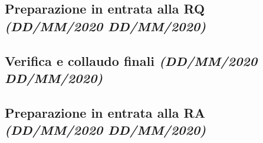\documentclass[../piano-di-progetto.tex]{subfiles}
\begin{document}
\subsection[Preparazione in entrata alla RQ]{Preparazione in entrata alla RQ {\normalsize\normalfont\itshape(DD/MM/2020  DD/MM/2020)}}%
\label{sub:preparazione_in_entrata_alla_rq}
\subsection[Verifica e collaudo finali]{Verifica e collaudo finali {\normalsize\normalfont\itshape(DD/MM/2020  DD/MM/2020)}}%
\label{sub:verifica_e_collaudo_finali}
\subsection[Preparazione in entrata alla RA]{Preparazione in entrata alla RA {\normalsize\normalfont\itshape(DD/MM/2020  DD/MM/2020)}}%
\label{sub:preparazione_in_entrata_alla_ra}
\end{document}
